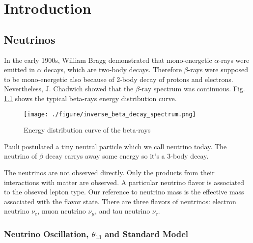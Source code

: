 
\chapter{Introduction}

\section{Neutrinos}

In the early 1900s, William Bragg demonstrated that mono-energetic $\alpha$-rays
were emitted in $\alpha$ decays\cite{Franklin:ch1}, which are two-body decays. Therefore $\beta$-rays
were supposed to be mono-energetic also because of 2-body decay of protons and
electrons. Nevertheless, J. Chadwich showed that the $\beta$-ray
spectrum was continuous\cite{Franklin:ch1}. Fig. \ref{fig:inverse_beta_decay_spectrum.png} shows the typical beta-rays energy distribution curve.


\begin{figure}
    \centering
    \texttt{[image: ./figure/inverse\_beta\_decay\_spectrum.png]}
    \caption{Energy distribution curve of the beta-rays \cite{Scott:1935}}
    \label{fig:inverse_beta_decay_spectrum.png}
    \end{figure}


Pauli postulated a tiny neutral particle which we call neutrino today. The neutrino
of $\beta$ decay carrys away some energy so it's a 3-body decay.\cite{Franklin:ch1}

The neutrinos are not observed directly. Only the products from their interactions
with matter are observed. A particular neutrino flavor is associated to the obseved lepton type.
Our reference to neutrino mass is the effective mass
associated with the flavor state.
There are three flavors of neutrinos: electron neutrino $\nu_e$, muon neutrino $\nu_{\mu}$, and
tau neutrino $\nu_{\tau}$.\cite{Franklin:ch1}\cite{pdg}




\subsection{Neutrino Oscillation, $\theta_{13}$ and Standard Model}



